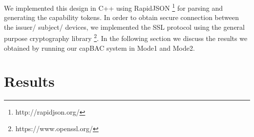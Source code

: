 We implemented this design in C++ using RapidJSON \footnote{http://rapidjson.org/} for parsing and generating the capability tokens. In order to obtain secure connection between the issuer/ subject/ devices, we implemented the SSL protocol using the general purpose cryptography library \footnote{https://www.openssl.org/}. In the following section we discuss the results we obtained by running our capBAC system in Mode1 and Mode2. 

\section{Results}
\label{sec:results}